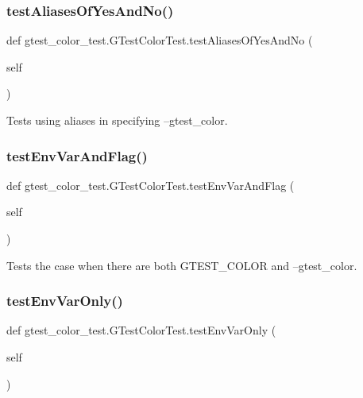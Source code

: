 \subsubsection{\texorpdfstring{test\+Aliases\+Of\+Yes\+And\+No()}{testAliasesOfYesAndNo()}}
{\footnotesize\ttfamily def gtest\+\_\+color\+\_\+test.\+G\+Test\+Color\+Test.\+test\+Aliases\+Of\+Yes\+And\+No (\begin{DoxyParamCaption}\item[{}]{self }\end{DoxyParamCaption})}

\begin{DoxyVerb}Tests using aliases in specifying --gtest_color.\end{DoxyVerb}
 \mbox{\label{classgtest__color__test_1_1_g_test_color_test_ae88e8ec526135ed1448e83fc4ec7cd15}} 
\subsubsection{\texorpdfstring{test\+Env\+Var\+And\+Flag()}{testEnvVarAndFlag()}}
{\footnotesize\ttfamily def gtest\+\_\+color\+\_\+test.\+G\+Test\+Color\+Test.\+test\+Env\+Var\+And\+Flag (\begin{DoxyParamCaption}\item[{}]{self }\end{DoxyParamCaption})}

\begin{DoxyVerb}Tests the case when there are both GTEST_COLOR and --gtest_color.\end{DoxyVerb}
 \mbox{\label{classgtest__color__test_1_1_g_test_color_test_aedb7bbaa0d6acff3628d91a471f4ceb5}} 
\subsubsection{\texorpdfstring{test\+Env\+Var\+Only()}{testEnvVarOnly()}}
{\footnotesize\ttfamily def gtest\+\_\+color\+\_\+test.\+G\+Test\+Color\+Test.\+test\+Env\+Var\+Only (\begin{DoxyParamCaption}\item[{}]{self }\end{DoxyParamCaption})}

